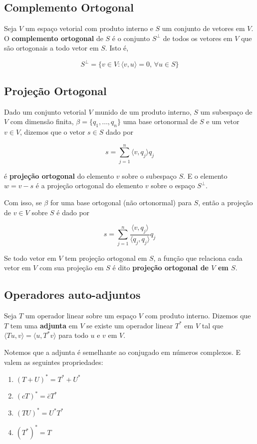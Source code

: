 \documentclass[12pt,a4paper]{article}
\begin{document}
\subsection{Complemento Ortogonal}

Seja $V$ um espaço vetorial com produto interno e $S$ um conjunto de vetores em $V$. O \textbf{complemento ortogonal} de $S$ é o conjunto $S^\perp$ de todos os vetores em $V$ que são ortogonais a todo vetor em $S$. Isto é,

\[
S^\perp = \{ v \in V : \langle v, u \rangle = 0, \, \forall u \in S \}  
\]

\subsection{Projeção Ortogonal}

Dado um conjunto vetorial $V$ munido de um produto interno, $S$ um subespaço de $V$ com dimensão finita, $\beta = \{ q_1, \ldots, q_n \}$ uma base ortonormal de $S$ e um vetor $v \in V$, dizemos que o vetor $s \in S$ dado por

\[
s = \sum_{j=1}^n \langle v, q_j \rangle q_j
\]

é \textbf{projeção ortogonal} do elemento $v$ sobre o subespaço $S$. E o elemento $w = v-s$ é a projeção ortogonal do elemento $v$ sobre o espaço $S^\perp$.

Com isso, se $\beta$ for uma base ortogonal (não ortonormal) para $S$, então a projeção de $v \in V$ sobre $S$ é dado por

\[
s = \sum_{j=1}^n \frac{\langle v, q_j \rangle}{\langle q_j, q_j \rangle} q_j
\]

Se todo vetor em $V$ tem projeção ortogonal em $S$, a função que relaciona cada vetor em $V$ com sua projeção em $S$ é dito \textbf{projeção ortogonal de $V$ em $S$}.

\subsection{Operadores auto-adjuntos}

Seja $T$ um operador linear sobre um espaço $V$ com produto interno. Dizemos que $T$ tem uma \textbf{adjunta} em $V$ se existe um operador linear $T^\ast$ em $V$ tal que $\langle T u, v \rangle = \langle u, T^\ast v \rangle$ para todo $u$ e $v$ em $V$.

Notemos que a adjunta é semelhante ao conjugado em números complexos. E valem as seguintes propriedades:

\begin{enumerate}
\item $(T+U)^{\ast} = T^* + U^*$
\item $(cT)^* = \bar{c}T^*$
\item $(TU)^* = U^*T^*$
\item $(T^*)^* = T$
\end{enumerate}
\end{document}
